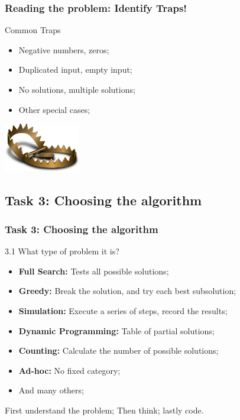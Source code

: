 \documentclass{beamer}
\begin{document}
\begin{frame}
  \frametitle{Reading the problem: Identify Traps!}


  \begin{block}{Common Traps}
    \begin{itemize}
    \item Negative numbers, zeros;
    \item Duplicated input, empty input;
    \item No solutions, multiple solutions;
    \item Other special cases;
    \end{itemize}
  \end{block}

  \hfill \includegraphics[width=0.25\textwidth]{../img/trap}
\end{frame}

\subsection{Task 3: Choosing the algorithm}

\begin{frame}
  \frametitle{Task 3: Choosing the algorithm}
  \begin{block}{3.1 What type of problem it is?}
    \begin{itemize}
    \item {\bf Full Search:} Tests all possible solutions;
    \item {\bf Greedy:} Break the solution, and try each best subsolution;
    \item {\bf Simulation:} Execute a series of steps, record the results;
    \item {\bf Dynamic Programming:} Table of partial solutions;
    \item {\bf Counting:} Calculate the number of possible solutions;
    \item {\bf Ad-hoc:} No fixed category;
    \item And many others;
    \end{itemize}
  \end{block}

  \bigskip

  First understand the problem; Then think; \alert{lastly code}.
\end{frame}
\end{document}
